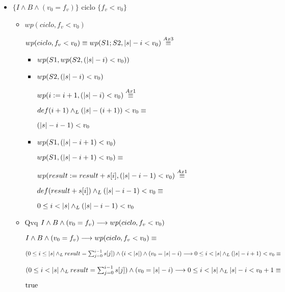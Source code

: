 \documentclass{article}
\begin{document}
\begin{itemize}
    \item $\{I \wedge B \wedge (v_{0} = f_{v})\}$ ciclo $\{f_{v} < v_{0}\}$

        \begin{itemize}
            \item $wp(ciclo, f_{v} < v_{0})$

                $wp(ciclo, f_{v} < v_{0}) \equiv wp(S1;S2, |s| - i < v_{0}) \stackrel{Ax3}{\equiv}$ 
    
            \begin{itemize}
                \item $wp(S1, wp(S2, (|s| - i) < v_{0}))$

                \item $wp(S2, (|s| - i) < v_{0})$

                    $wp(i:= i + 1, (|s|-i) < v_{0}) \stackrel{Ax1}{\equiv}$

                    $def(i + 1) \land _L (|s|-(i+1)) < v_{0} \equiv$

                    $(|s|-i-1) < v_{0}$

                \item $wp(S1, (|s|-i+1) < v_{0})$
                
                    $wp(S1, (|s|-i+1) < v_{0}) \equiv$

                    $wp(result := result + s[i], (|s|-i-1) < v_{0}) \stackrel{Ax1}{\equiv}$

                    $def(result + s[i]) \land _L (|s|-i-1) < v_{0} \equiv$

                    $0 \leq i < |s| \land _L (|s|-i-1) < v_{0}$
            \end{itemize}

            \item Qvq $I \wedge B \wedge (v_{0} = f_{v}) \longrightarrow wp(ciclo, f_{v} < v_{0})$

                $I \wedge B \wedge (v_{0} = f_{v}) \longrightarrow wp(ciclo, f_{v} < v_{0}) \equiv$

                $(0 \leq i \leq |s| \land _L result = \sum_{j=0}^{i-1} s[j]) \wedge
                    (i < |s|) \wedge (v_{0} = |s| - i) \longrightarrow
                    0 \leq i < |s| \land _L (|s|-i+1) < v_{0} \equiv$

                $(0 \leq i < |s| \land _L result = \sum_{j=0}^{i-1} s[j]) \wedge
                    (v_{0} = |s| - i) \longrightarrow
                    0 \leq i < |s| \land _L |s|-i < v_{0} + 1  \equiv$

                $\mathrm{true}$

        \end{itemize}

\end{itemize}
\end{document}
